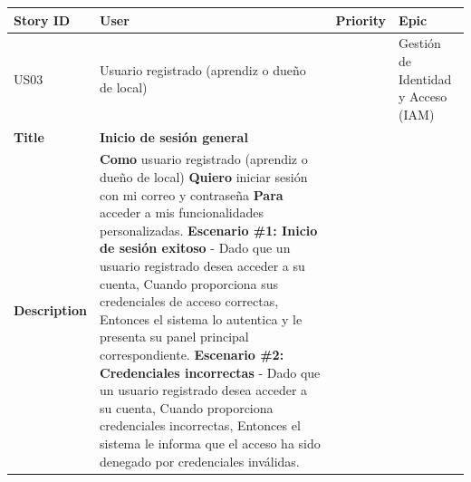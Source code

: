 {\def\LTcaptype{none} %
\begin{longtable}[]{@{}
  >{\raggedright\arraybackslash}p{}
  >{\raggedright\arraybackslash}p{}
  >{\raggedright\arraybackslash}p{}
  >{\raggedright\arraybackslash}p{}@{}}
\toprule\noalign{}
\begin{minipage}[b]{\linewidth}\raggedright
Story ID
\end{minipage} & \begin{minipage}[b]{\linewidth}\raggedright
User
\end{minipage} & \begin{minipage}[b]{\linewidth}\raggedright
Priority
\end{minipage} & \begin{minipage}[b]{\linewidth}\raggedright
Epic
\end{minipage} \\
\midrule\noalign{}
\endhead
\bottomrule\noalign{}
\endlastfoot
US03 & Usuario registrado (aprendiz o dueño de local) & 3 & Gestión de
Identidad y Acceso (IAM) \\
\textbf{Title} & \textbf{Inicio de sesión general} & & \\
\textbf{Description} & \textbf{Como} usuario registrado (aprendiz o
dueño de local) \textbf{Quiero} iniciar sesión con mi correo y
contraseña \textbf{Para} acceder a mis funcionalidades personalizadas.
\textbf{Escenario \#1: Inicio de sesión exitoso} - Dado que un usuario
registrado desea acceder a su cuenta, Cuando proporciona sus
credenciales de acceso correctas, Entonces el sistema lo autentica y le
presenta su panel principal correspondiente. \textbf{Escenario \#2:
Credenciales incorrectas} - Dado que un usuario registrado desea acceder
a su cuenta, Cuando proporciona credenciales incorrectas, Entonces el
sistema le informa que el acceso ha sido denegado por credenciales
inválidas. & & \\
\end{longtable}
}

